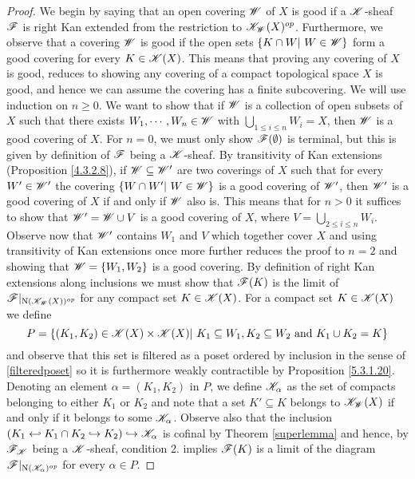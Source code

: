 \documentclass[../../thesis.tex]{subfiles}
\begin{document}
\begin{proof}
    We begin by saying that an open covering $\mathscr{W}$ of $X$ is good if a $\mathscr{K}$-sheaf $\mathscr{F}$ is right Kan extended from the restriction to $\mathscr{K}_{\mathscr{W}}(X)^{op}$.
    Furthermore, we observe that a covering $\mathscr{W}$ is good if the open sets $\{K \cap W | W \in \W\}$ form a good covering for every $K\in \mathscr{K}(X)$.
    This means that proving any covering of $X$ is good, reduces to showing any covering of a compact topological space $X$ is good, and hence we can assume the covering has a finite subcovering.
    \newline
    We will use induction on $n \geq 0$.
    We want to show that if $\mathscr{W}$ is a collection of open subsets of $X$ such that there exists $W_1, \cdots ,W_n \in \mathscr{W}$ with $\bigcup_{1 \leq i \leq n}W_i = X$, then $\mathscr{W}$ is a good covering of $X$.
    For $n=0$, we must only show $\mathscr{F}(\emptyset)$ is terminal, but this is given by definition of $\mathscr{F}$ being a $\mathscr{K}$-sheaf.
    \newline
    By transitivity of Kan extensions (Proposition \ref{4.3.2.8}), if $\mathscr{W} \subseteq \mathscr{W}'$ are two coverings of $X$ such that for every $W' \in \mathscr{W}'$ the covering $\{ W \cap W' | W \in \W\}$ is a good covering of $\mathscr{W}'$, then $\mathscr{W}'$ is a good covering of $X$ if and only if $\mathscr{W}$ also is.
    \newline
    This means that for $n>0$ it suffices to show that $\mathscr{W}' = \mathscr{W} \cup V$ is a good covering of $X$, where $V = \bigcup_{2 \leq i \leq n}W_i$.
    Observe now that $\mathscr{W}'$ contains $W_1$ and $V$ which together cover $X$ and using transitivity of Kan extensions once more further reduces the proof to $n = 2$ and showing that $\mathscr{W} = \{W_1, W_2\}$ is a good covering.
    \newline
    By definition of right Kan extensions along inclusions we must show that $\mathscr{F}(K)$ is the limit of $\mathscr{F}|_{\mathrm{N}(\mathscr{K}_{\mathscr{W}}(X))^{op}}$ for any compact set $K \in \mathscr{K}(X)$.
    For a compact set $K\in \mathscr{K}(X)$ we define
    \[
        P = \{(K_1, K_2) \in \K(X)\times \K(X) | K_1 \subseteq W_1, K_2 \subseteq W_2 \text{ and } K_1 \cup K_2 = K\}
    \]
    and observe that this set is filtered as a poset ordered by inclusion in the sense of \ref{filteredposet} so it is furthermore weakly contractible by Proposition \ref{5.3.1.20}.
    Denoting an element $\alpha = (K_1, K_2)$ in $P$, we define $\mathscr{K}_{\alpha}$ as the set of compacts belonging to either $K_1$ or $K_2$ and note that a set $K' \subseteq K$ belongs to $\mathscr{K}_{\mathscr{W}}(X)$ if and only if it belongs to some $\mathscr{K}_{\alpha}$.
    Observe also that the inclusion $(K_1 \hookleftarrow K_1 \cap K_2 \hookrightarrow K_2 ) \hookrightarrow \mathscr{K}_{\alpha}$ is cofinal by Theorem \ref{superlemma} and hence, by $\mathscr{F}_{\mathscr{K}}$ being a $\mathscr{K}$-sheaf, condition 2. implies $\mathscr{F}(K)$ is a limit of the diagram $\mathscr{F}|_{\mathrm{N}(\mathscr{K}_{\alpha})^{op}}$ for every $\alpha \in P$.

\end{proof}
\end{document}
